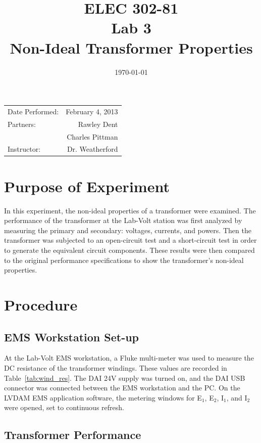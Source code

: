\documentclass{article}
\title{ELEC 302-81\\ Lab 3\\ Non-Ideal Transformer Properties} %
\date{\today} %
\begin{document}
\maketitle

\begin{center}
  \begin{tabular}{lr}
    Date Performed: & February 4, 2013 \\
    Partners: & Rawley Dent \\
              & Charles Pittman \\
    Instructor: & Dr. Weatherford
  \end{tabular}
\end{center}

\pagebreak


\section{Purpose of Experiment}

In this experiment, the non-ideal properties of a transformer were examined.
The performance of the transformer at the Lab-Volt station was first analyzed
by measuring the primary and secondary: voltages, currents, and powers. Then
the transformer was subjected to an open-circuit test and a short-circuit test
in order to generate the equivalent circuit components. These results were then
compared to the original performance specifications to show the transformer's
non-ideal properties.

\section{Procedure}

\subsection{EMS Workstation Set-up}

At the Lab-Volt EMS workstation, a Fluke multi-meter was used to measure the DC
resistance of the transformer windings. These values are recorded in
Table~\ref{tab:wind_res}.  The DAI 24V supply was turned on, and the DAI USB
connector was connected between the EMS workstation and the {PC}. On the LVDAM
EMS application software, the metering windows for E$_1$, E$_2$, I$_1$, and
I$_2$ were opened, set to continuous refresh.

\subsection{Transformer Performance}
\end{document}
